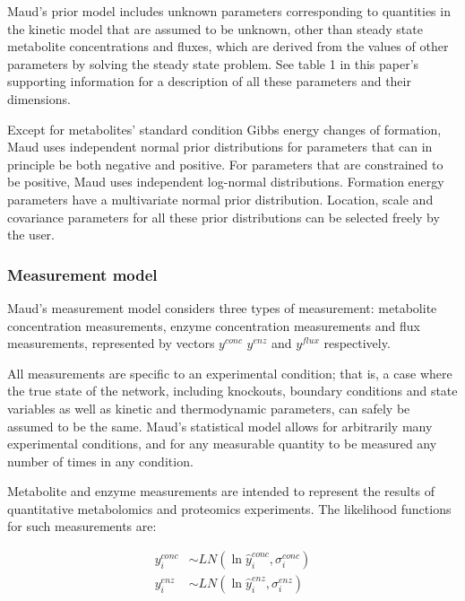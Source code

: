 \documentclass[journal=asbcd6,manuscript=article,layout=traditional]{achemso}
\begin{document}
Maud's prior model includes unknown parameters corresponding to
quantities in the kinetic model that are assumed to be unknown, other
than steady state metabolite concentrations and fluxes, which are
derived from the values of other parameters by solving the steady state
problem. See table 1 in this paper's supporting information for a
description of all these parameters and their dimensions.

Except for metabolites' standard condition Gibbs energy changes of
formation, Maud uses independent normal prior distributions for
parameters that can in principle be both negative and positive. For
parameters that are constrained to be positive, Maud uses independent
log-normal distributions. Formation energy parameters have a
multivariate normal prior distribution. Location, scale and covariance
parameters for all these prior distributions can be selected freely by
the user.

\subsubsection{Measurement model}\label{measurement-model}

Maud's measurement model considers three types of measurement:
metabolite concentration measurements, enzyme concentration measurements
and flux measurements, represented by vectors \(𝑦^{𝑐𝑜𝑛𝑐}\) \(𝑦^{𝑒𝑛𝑧}\)
and \(𝑦^{𝑓𝑙𝑢𝑥}\) respectively.

All measurements are specific to an experimental condition; that is, a
case where the true state of the network, including knockouts, boundary
conditions and state variables as well as kinetic and thermodynamic
parameters, can safely be assumed to be the same. Maud's statistical
model allows for arbitrarily many experimental conditions, and for any
measurable quantity to be measured any number of times in any condition.

Metabolite and enzyme measurements are intended to represent the results
of quantitative metabolomics and proteomics experiments. The likelihood
functions for such measurements are:

\begin{align}
y_i^{conc} &\sim LN(\ln{\hat{y}_i^{conc}}, \sigma_i^{conc})\label{eq-yconc} \\
y_i^{enz} &\sim LN(\ln{\hat{y}_i^{enz}}, \sigma_i^{enz})\label{eq-yenz}
\end{align}
\end{document}
